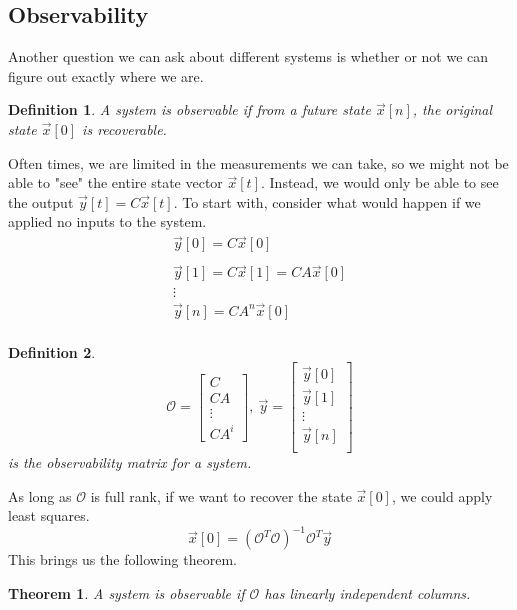 \documentclass{article}
\newtheorem{theorem}{Theorem}
\newtheorem{definition}{Definition}
\begin{document}
\subsection{Observability}
Another question we can ask about different systems is whether or not we can figure out exactly where we are.
\begin{definition}
    A system is observable if from a future state $\vec{x}[n]$, the original state $\vec{x}[0]$ is recoverable.
\end{definition}
Often times, we are limited in the measurements we can take, so we might not be able to "see" the entire state vector $\vec{x}[t]$.
Instead, we would only be able to see the output $\vec{y}[t]=C\vec{x}[t]$. To start with, consider what would happen if we applied no inputs to the system.
\[
    \begin{array}{c}
        \vec{y}[0] = C\vec{x}[0]\\\\
        \vec{y}[1] = C\vec{x}[1] = CA\vec{x}[0]\\
        \vdots\\
        \vec{y}[n] = CA^n\vec{x}[0]\\
    \end{array}
\]
\begin{definition}
    \[
    \mathcal{O} = \left[
        \begin{array}{c}
            C\\
            CA\\
            \vdots\\
            CA^i
        \end{array}
    \right],\ \vec{y} = \left[
        \begin{array}{c}
            \vec{y}[0]\\
            \vec{y}[1]\\
            \vdots\\
            \vec{y}[n]\\
        \end{array}
        \right]
\]
is the observability matrix for a system.
\end{definition}
As long as $\mathcal{O}$ is full rank, if we want to recover the state $\vec{x}[0]$, we could apply least squares.
$$\vec{x}[0] = (\mathcal{O}^T\mathcal{O})^{-1}\mathcal{O}^T\vec{y}$$
This brings us the following theorem.
\begin{theorem}
    A system is observable if $\mathcal{O}$ has linearly independent columns.
\end{theorem}
\end{document}
